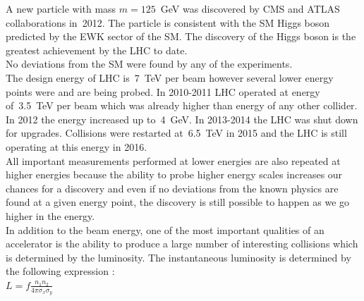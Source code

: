 A new particle with mass $m=125$~GeV was discovered by CMS \cite{ref_HiggsPaperCMS} and ATLAS \cite{ref_HiggsPaperATLAS} collaborations in~2012. The particle is consistent with the SM Higgs boson predicted by the EWK sector of the SM. The discovery of the Higgs boson is the greatest achievement by the LHC to date. \\


No deviations from the SM were found by any of the experiments. \\



The design energy of LHC is~7~TeV per beam however several lower energy points were and are being probed. In 2010-2011 LHC operated at energy of~3.5~TeV per beam which was already higher than energy of any other collider. In 2012 the energy increased up to~4~GeV. In 2013-2014 the LHC was shut down for upgrades. Collisions were restarted at~6.5~TeV in 2015 and the LHC is still operating at this energy in 2016.\\ 

All important measurements performed at lower energies are also repeated at higher energies because the ability to probe higher energy scales increases our chances for a discovery and even if no deviations from the known physics are found at a given energy point, the discovery is still possible to happen as we go higher in the energy. \\ 

In addition to the beam energy, one of the most important qualities of an accelerator is the ability to produce a large number of interesting collisions which is determined by the luminosity. The instantaneous luminosity is determined by the following expression \cite{ref_PDG}:\\

$L = f \frac{n_1 n_2}{4 \pi \sigma_x \sigma_y}$

\\

